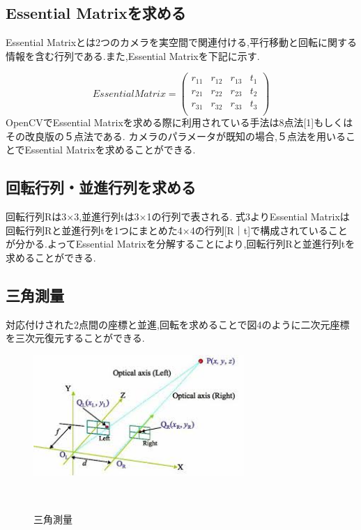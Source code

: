 \documentclass[a4paper]{jarticle}
\begin{document}
\subsection{Essential Matrixを求める}
Essential Matrixとは2つのカメラを実空間で関連付ける,平行移動と回転に関する情報を含む行列である.また,Essential Matrixを下記に示す.

\begin{equation}
       Essential Matrix = \left(
    \begin{array}{cccc}
      r _{11} & r _{12} & r _{13} & t_1\\
      r _{21} & r _{22} & r _{23} & t_2\\
      r _{31} & r _{32} & r _{33} & t_3\\

    \end{array}
  \right)
\end{equation}
OpenCVでEssential Matrixを求める際に利用されている手法は8点法{\scriptsize[1]}もしくはその改良版の５点法である.
カメラのパラメータが既知の場合,５点法を用いることでEssential Matrixを求めることができる.


\subsection{回転行列・並進行列を求める}
回転行列Rは3×3,並進行列tは3×1の行列で表される.
式3よりEssential Matrixは回転行列Rと並進行列tを1つにまとめた4×4の行列[R｜t]で構成されていることが分かる.よってEssential Matrixを分解することにより,回転行列Rと並進行列tを求めることができる.

\subsection{三角測量}
対応付けされた2点間の座標と並進,回転を求めることで図4のように二次元座標を三次元復元することができる.

\begin{figure}[b]
 \begin{center}
  \includegraphics[width=80mm]{image/index.jpeg}
 　\caption{三角測量}%
 　\label{fig:01}%
 \end{center}
\end{figure}
\end{document}
